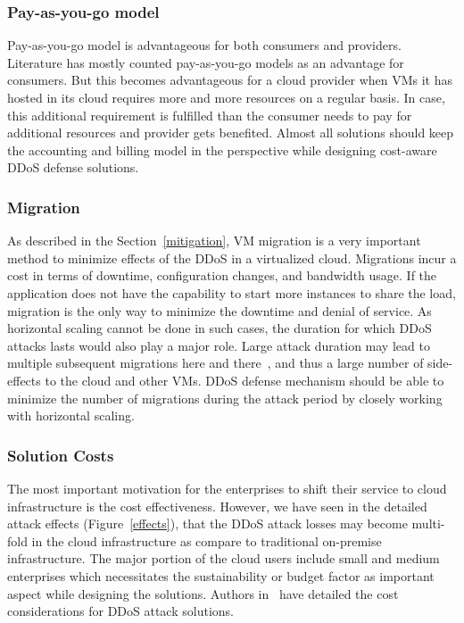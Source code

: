 \documentclass[final,5p,times,twocolumn]{elsarticle}
\begin{document}
\subsubsection{Pay-as-you-go model}
Pay-as-you-go model is advantageous for both consumers and providers. Literature has mostly counted pay-as-you-go models as an advantage for consumers. But this becomes advantageous for a cloud provider when VMs it has hosted in its cloud requires more and more resources on a regular basis. In case, this additional requirement is fulfilled than the consumer needs to pay for additional resources and provider gets benefited. Almost all solutions should keep the accounting and billing model in the perspective while designing cost-aware DDoS defense solutions. 
\subsubsection{Migration}
As described in the Section~\ref{mitigation}, VM migration is a very important method to minimize effects of the DDoS in a virtualized cloud. Migrations incur a cost in terms of downtime, configuration changes, and bandwidth usage. If the application does not have the capability to start more instances to share the load, migration is the only way to minimize the downtime and denial of service. As horizontal scaling cannot be done in such cases, the duration for which DDoS attacks lasts would also play a major role. Large attack duration may lead to multiple subsequent migrations here and there~\cite{somani2016ddos}, and thus a large number of side-effects to the cloud and other VMs. DDoS defense mechanism should be able to minimize the number of migrations during the attack period by closely working with horizontal scaling.
\subsubsection{Solution Costs}
{The most important motivation for the enterprises to shift their service to cloud infrastructure is the cost effectiveness. However, we have seen in the detailed attack effects (Figure~\ref{effects}), that the DDoS attack losses may become multi-fold in the cloud infrastructure as compare to traditional on-premise infrastructure. The major portion of the cloud users include small and medium enterprises which necessitates the sustainability or budget factor as important aspect while designing the solutions. Authors in~\cite{IEEECC} have detailed the cost considerations for DDoS attack solutions.}
\end{document}
